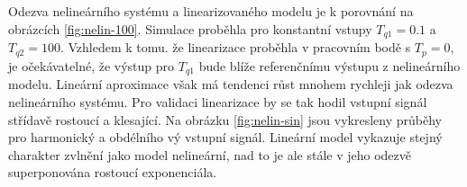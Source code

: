 \documentclass[twoside]{article}
\begin{document}
\subsection{}
Odezva nelineárního systému a linearizovaného modelu je k porovnání na obrázcích \ref{fig:nelin-100}. Simulace proběhla
pro konstantní vstupy $T_{q1} = 0.1$ a $T_{q2} = 100$. Vzhledem k tomu. že linearizace proběhla v pracovním bodě s $T_p = 0$,
je očekávatelné, že výstup pro $T_{q1}$ bude blíže referenčnímu výstupu z nelineárního modelu. Lineární aproximace však
má tendenci růst mnohem rychleji jak odezva nelineárního systému.
Pro validaci linearizace by se tak hodil vstupní signál střídavě rostoucí a klesající. Na obrázku \ref{fig:nelin-sin}
jsou vykresleny průběhy pro harmonický a obdélního vý vstupní signál. Lineární model vykazuje stejný charakter
zvlnění jako model nelineární, nad to je ale stále v jeho odezvě superponována rostoucí exponenciála.
\end{document}
